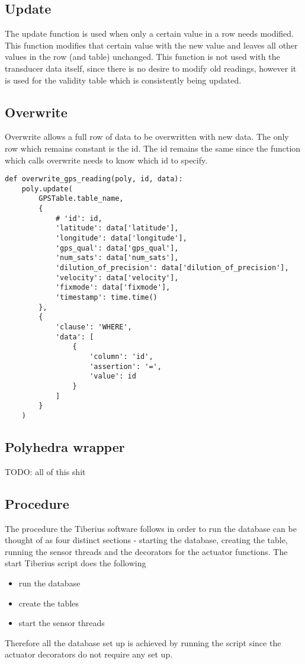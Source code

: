\subsection{Update}
The update function is used when only a certain value in a row needs modified. This function modifies that certain value with the new value and leaves all other values in the row (and table) unchanged. This function is not used with the transducer data itself, since there is no desire to modify old readings, however it is used for the validity table which is consistently being updated. 


\subsection{Overwrite}
Overwrite allows a full row of data to be overwritten with new data. The only row which remains constant is the id. The id remains the same since the function which calls overwrite needs to know which id to specify. 

\begin{lstlisting}[style=custompython]
def overwrite_gps_reading(poly, id, data):
    poly.update(
        GPSTable.table_name,
        {
            # 'id': id,
            'latitude': data['latitude'],
            'longitude': data['longitude'],
            'gps_qual': data['gps_qual'],
            'num_sats': data['num_sats'],
            'dilution_of_precision': data['dilution_of_precision'],
            'velocity': data['velocity'],
            'fixmode': data['fixmode'],
            'timestamp': time.time()
        },
        {
            'clause': 'WHERE',
            'data': [
                {
                    'column': 'id',
                    'assertion': '=',
                    'value': id
                }
            ]
        }
    )
\end{lstlisting}

\subsection{Polyhedra wrapper}

TODO: all of this shit





\subsection{Procedure}
\label{database_process}
The procedure the Tiberius software follows in order to run the database can be thought of as four distinct sections - starting the database, creating the table, running the sensor threads and the decorators for the actuator functions. 
\newline
The start Tiberius script does the following
\begin{itemize}
\item run the database
\item create the tables
\item start the sensor threads
\end{itemize} 
Therefore all the database set up is achieved by running the script since the actuator decorators do not require any set up.

